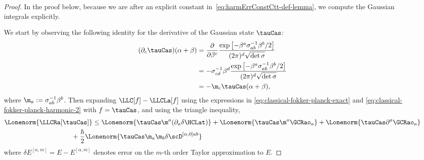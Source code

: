 \documentclass{article}
\numberwithin{equation}{section}
\begin{document}
\begin{proof}
In the proof below, because we are after an explicit constant in~\eqref{eq:harmErrConstCtt-def-lemma}, we compute the Gaussian integrals explicitly.

We start by observing the following identity for the derivative of the Gaussian state $\tauCas$:
\begin{align}\begin{split}\label{eq:deriv-gaussian}
		(\partial_c \tauCas)(\alpha+\beta) &= \frac{\partial}{\partial \beta^c} \frac{\exp\left[-\beta^a\sigma^{-1}_{ab}\beta^b/2\right]}{(2 \pi)^d\sqrt{\det\sigma}}\\
		&= -\sigma^{-1}_{cd} \beta^d  \frac{\exp\left[-\beta^a\sigma^{-1}_{ab}\beta^b/2\right]}{(2 \pi)^d \sqrt{\det\sigma}}\\
		&= -\m_c \tauCas(\alpha+\beta),\\
\end{split}\end{align}
where 
$\m_a:= \sigma^{-1}_{ab} \beta^b$.  
Then expanding $\LLC[f]-\LLCLa[f]$ using
the expressions in \eqref{eq:classical-fokker-planck-exact} and \eqref{eq:classical-fokker-planck-harmonic-2} with $f=\tauCas$, and using the triangle inequality,
\begin{align}\begin{split}\label{eq:classical-bound-decomp}
		&\Lonenorm{\LLCRa [\tauCas]}
		\le
		\Lonenorm{ \tauCas \m^a(\partial_a \delta \HCLat)} + \Lonenorm{ \tauCas \m^a \GCRao_{a} } + \Lonenorm{ \tauCas \partial^a  \GCRao_{a} }\\
		&\qquad \qquad \qquad \qquad\qquad + \frac{\hbar}{2} \Lonenorm{ \tauCas \m_a \m_b \delta\scD^{[\alpha,0]ab}}
\end{split}\end{align}
where $\delta E^{[\alpha,m]} = E - E^{[\alpha,m]}$ denotes error on the $m$-th order Taylor approximation to $E$.


\end{proof}
\end{document}
